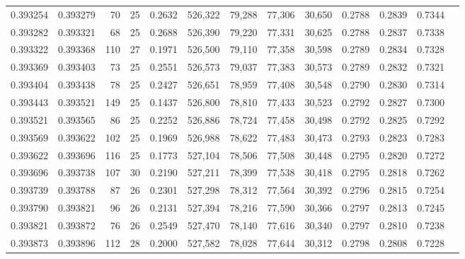 \begin{tabular}{rrrrrrrrrrrrr}
0.393254 & 0.393279 &    70 &  25 &                                     0.2632 & 526,322 &  79,288 &  77,306 &  30,650 & 0.2788 & 0.2839 & 0.7344 \\
0.393282 & 0.393321 &    68 &  25 &                                     0.2688 & 526,390 &  79,220 &  77,331 &  30,625 & 0.2788 & 0.2837 & 0.7338 \\
0.393322 & 0.393368 &   110 &  27 &                                     0.1971 & 526,500 &  79,110 &  77,358 &  30,598 & 0.2789 & 0.2834 & 0.7328 \\
0.393369 & 0.393403 &    73 &  25 &                                     0.2551 & 526,573 &  79,037 &  77,383 &  30,573 & 0.2789 & 0.2832 & 0.7321 \\
0.393404 & 0.393438 &    78 &  25 &                                     0.2427 & 526,651 &  78,959 &  77,408 &  30,548 & 0.2790 & 0.2830 & 0.7314 \\
0.393443 & 0.393521 &   149 &  25 &                                     0.1437 & 526,800 &  78,810 &  77,433 &  30,523 & 0.2792 & 0.2827 & 0.7300 \\
0.393521 & 0.393565 &    86 &  25 &                                     0.2252 & 526,886 &  78,724 &  77,458 &  30,498 & 0.2792 & 0.2825 & 0.7292 \\
0.393569 & 0.393622 &   102 &  25 &                                     0.1969 & 526,988 &  78,622 &  77,483 &  30,473 & 0.2793 & 0.2823 & 0.7283 \\
0.393622 & 0.393696 &   116 &  25 &                                     0.1773 & 527,104 &  78,506 &  77,508 &  30,448 & 0.2795 & 0.2820 & 0.7272 \\
0.393696 & 0.393738 &   107 &  30 &                                     0.2190 & 527,211 &  78,399 &  77,538 &  30,418 & 0.2795 & 0.2818 & 0.7262 \\
0.393739 & 0.393788 &    87 &  26 &                                     0.2301 & 527,298 &  78,312 &  77,564 &  30,392 & 0.2796 & 0.2815 & 0.7254 \\
0.393790 & 0.393821 &    96 &  26 &                                     0.2131 & 527,394 &  78,216 &  77,590 &  30,366 & 0.2797 & 0.2813 & 0.7245 \\
0.393821 & 0.393872 &    76 &  26 &                                     0.2549 & 527,470 &  78,140 &  77,616 &  30,340 & 0.2797 & 0.2810 & 0.7238 \\
0.393873 & 0.393896 &   112 &  28 &                                     0.2000 & 527,582 &  78,028 &  77,644 &  30,312 & 0.2798 & 0.2808 & 0.7228 \\

\end{tabular}
